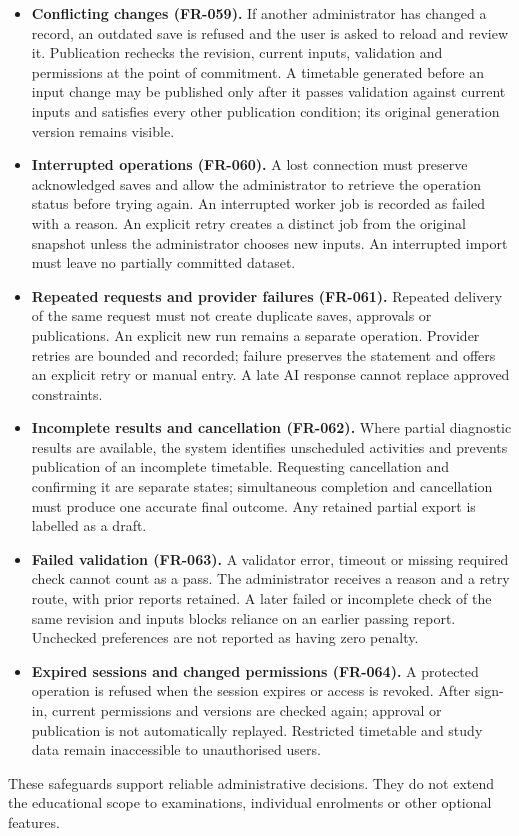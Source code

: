 \documentclass[
  11pt,a4paper,oneside]{report}
\begin{document}
\begin{itemize}
\item \textbf{Conflicting changes (FR-059).} If another administrator has changed a record, an outdated save is refused and the user is asked to reload and review it. Publication rechecks the revision, current inputs, validation and permissions at the point of commitment. A timetable generated before an input change may be published only after it passes validation against current inputs and satisfies every other publication condition; its original generation version remains visible.
\item \textbf{Interrupted operations (FR-060).} A lost connection must preserve acknowledged saves and allow the administrator to retrieve the operation status before trying again. An interrupted worker job is recorded as failed with a reason. An explicit retry creates a distinct job from the original snapshot unless the administrator chooses new inputs. An interrupted import must leave no partially committed dataset.
\item \textbf{Repeated requests and provider failures (FR-061).} Repeated delivery of the same request must not create duplicate saves, approvals or publications. An explicit new run remains a separate operation. Provider retries are bounded and recorded; failure preserves the statement and offers an explicit retry or manual entry. A late AI response cannot replace approved constraints.
\item \textbf{Incomplete results and cancellation (FR-062).} Where partial diagnostic results are available, the system identifies unscheduled activities and prevents publication of an incomplete timetable. Requesting cancellation and confirming it are separate states; simultaneous completion and cancellation must produce one accurate final outcome. Any retained partial export is labelled as a draft.
\item \textbf{Failed validation (FR-063).} A validator error, timeout or missing required check cannot count as a pass. The administrator receives a reason and a retry route, with prior reports retained. A later failed or incomplete check of the same revision and inputs blocks reliance on an earlier passing report. Unchecked preferences are not reported as having zero penalty.
\item \textbf{Expired sessions and changed permissions (FR-064).} A protected operation is refused when the session expires or access is revoked. After sign-in, current permissions and versions are checked again; approval or publication is not automatically replayed. Restricted timetable and study data remain inaccessible to unauthorised users.
\end{itemize}
These safeguards support reliable administrative decisions. They do not extend the educational scope to examinations, individual enrolments or other optional features.
\end{document}
